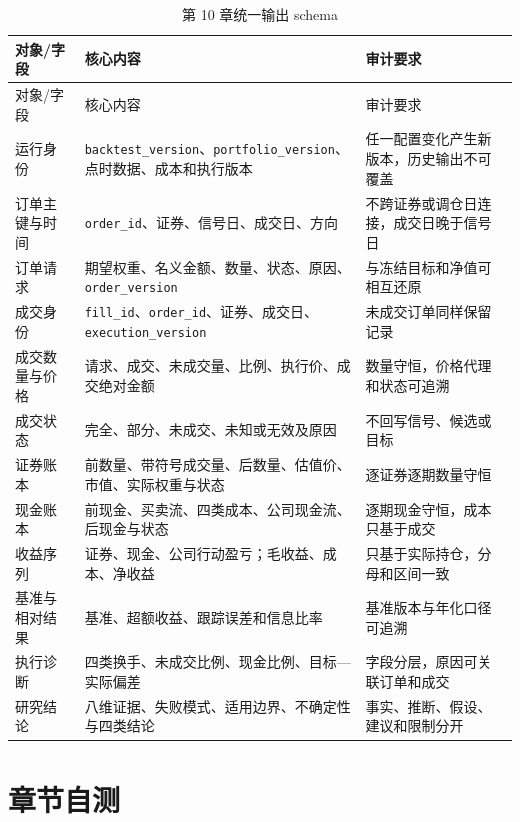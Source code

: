 \begingroup
\small
\begin{longtable}{@{}p{3.4cm}p{5.4cm}p{5.9cm}@{}}
\caption{第 10 章统一输出 schema}\label{tab:ch10-output-schema}\\
\toprule
对象/字段 & 核心内容 & 审计要求 \\
\midrule
\endfirsthead
\toprule
对象/字段 & 核心内容 & 审计要求 \\
\midrule
\endhead
运行身份 & \texttt{backtest\_version}、\texttt{portfolio\_version}、点时数据、成本和执行版本 & 任一配置变化产生新版本，历史输出不可覆盖 \\
订单主键与时间 & \texttt{order\_id}、证券、信号日、成交日、方向 & 不跨证券或调仓日连接，成交日晚于信号日 \\
订单请求 & 期望权重、名义金额、数量、状态、原因、\texttt{order\_version} & 与冻结目标和净值可相互还原 \\
成交身份 & \texttt{fill\_id}、\texttt{order\_id}、证券、成交日、\texttt{execution\_version} & 未成交订单同样保留记录 \\
成交数量与价格 & 请求、成交、未成交量、比例、执行价、成交绝对金额 & 数量守恒，价格代理和状态可追溯 \\
成交状态 & 完全、部分、未成交、未知或无效及原因 & 不回写信号、候选或目标 \\
证券账本 & 前数量、带符号成交量、后数量、估值价、市值、实际权重与状态 & 逐证券逐期数量守恒 \\
现金账本 & 前现金、买卖流、四类成本、公司现金流、后现金与状态 & 逐期现金守恒，成本只基于成交 \\
收益序列 & 证券、现金、公司行动盈亏；毛收益、成本、净收益 & 只基于实际持仓，分母和区间一致 \\
基准与相对结果 & 基准、超额收益、跟踪误差和信息比率 & 基准版本与年化口径可追溯 \\
执行诊断 & 四类换手、未成交比例、现金比例、目标---实际偏差 & 字段分层，原因可关联订单和成交 \\
研究结论 & 八维证据、失败模式、适用边界、不确定性与四类结论 & 事实、推断、假设、建议和限制分开 \\
\bottomrule
\end{longtable}
\endgroup

\section{章节自测}

